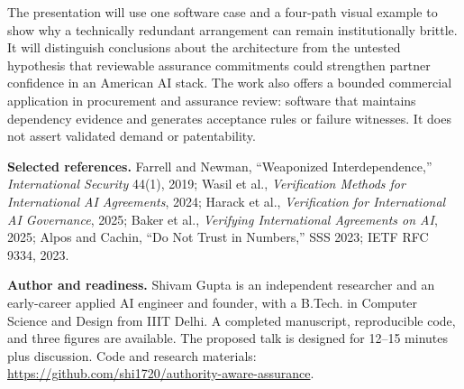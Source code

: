 \documentclass[11pt,letterpaper]{article}
\begin{document}
The presentation will use one software case and a four-path visual example to show why a technically redundant arrangement can remain institutionally brittle. It will distinguish conclusions about the architecture from the untested hypothesis that reviewable assurance commitments could strengthen partner confidence in an American AI stack. The work also offers a bounded commercial application in procurement and assurance review: software that maintains dependency evidence and generates acceptance rules or failure witnesses. It does not assert validated demand or patentability.

\textbf{Selected references.} Farrell and Newman, ``Weaponized Interdependence,'' \emph{International Security} 44(1), 2019; Wasil et al., \emph{Verification Methods for International AI Agreements}, 2024; Harack et al., \emph{Verification for International AI Governance}, 2025; Baker et al., \emph{Verifying International Agreements on AI}, 2025; Alpos and Cachin, ``Do Not Trust in Numbers,'' SSS 2023; IETF RFC 9334, 2023.

\textbf{Author and readiness.} Shivam Gupta is an independent researcher and an early-career applied AI engineer and founder, with a B.Tech. in Computer Science and Design from IIIT Delhi. A completed manuscript, reproducible code, and three figures are available. The proposed talk is designed for 12--15 minutes plus discussion. Code and research materials: \url{https://github.com/shi1720/authority-aware-assurance}.
\end{document}
